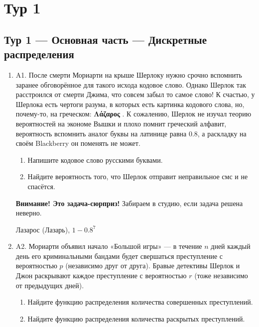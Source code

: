 \documentclass[12pt]{article}
\newenvironment{problem}{}{}
\newenvironment{sol}{}{} %
\begin{document}

\section{Тур 1}

\subsection{Тур 1 — Основная часть — Дискретные распределения}

\begin{enumerate}
\begin{problem}
\item[A1.] После смерти Мориарти на крыше Шерлоку нужно срочно вспомнить заранее обговорённое для такого исхода кодовое слово. Однако Шерлок так расстроился от смерти Джима, что совсем забыл то самое слово! К счастью, у Шерлока есть чертоги разума, в которых есть картинка кодового слова, но, почему-то, на греческом: \textbf{Λάζαρος} . К сожалению, Шерлок не изучал теорию вероятностей на экономе Вышки и плохо помнит греческий алфавит, вероятность вспомнить аналог буквы на латинице равна $0.8$, а раскладку на своём Blackberry он поменять не может.

\begin{enumerate}
\item Напишите кодовое слово русскими буквами.
\item Найдите вероятность того, что Шерлок отправит неправильное смс и не спасётся.
\end{enumerate}
\begin{sol}
\textbf{Внимание! Это задача-сюрприз!} Забираем в студию, если задача решена неверно.

Лазарос (Лазарь), $1-0.8^7$
\end{sol}
\end{problem}

\begin{problem}
\item[A2.] Мориарти объявил начало «Большой игры» — в течение $n$ дней каждый день его криминальными бандами будет свершаться преступление с вероятностью $p$ (независимо друг от друга). Бравые детективы Шерлок и Джон раскрывают каждое преступление с вероятностью $r$ (тоже независимо от предыдущих дней).
\begin{enumerate}
\item Найдите функцию распределения количества совершенных преступлений.
\item Найдите функцию распределения количества раскрытых преступлений. 
\end{enumerate}


\end{problem}
\end{enumerate}
\end{document}
